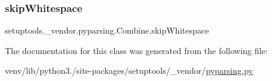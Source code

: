 \mbox{\label{classsetuptools_1_1__vendor_1_1pyparsing_1_1Combine_ad6d43d8440c852d1df965a59192a2c31}} 
\subsubsection{\texorpdfstring{skip\+Whitespace}{skipWhitespace}}
{\footnotesize\ttfamily setuptools.\+\_\+vendor.\+pyparsing.\+Combine.\+skip\+Whitespace}



The documentation for this class was generated from the following file\+:\begin{DoxyCompactItemize}
\item 
venv/lib/python3./site-\/packages/setuptools/\+\_\+vendor/\hyperlink{setuptools_2__vendor_2pyparsing_8py}{pyparsing.\+py}\end{DoxyCompactItemize}
